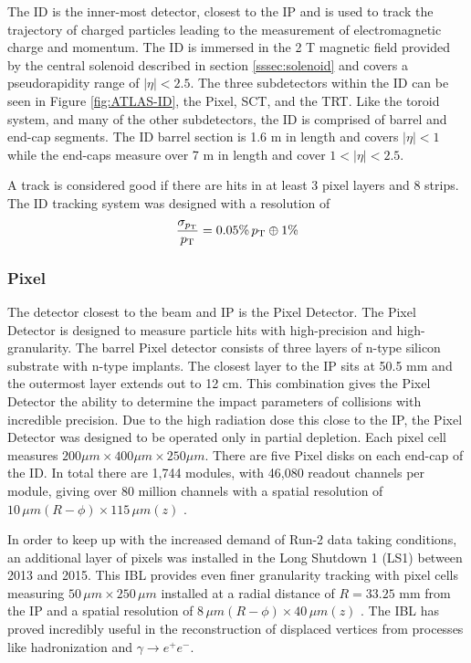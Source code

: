 		The \gls{ID} is the inner-most detector, closest to the \gls{IP} and is used to track the trajectory of charged particles leading to the measurement of electromagnetic charge and momentum. The \gls{ID} is immersed in the 2 T magnetic field provided by the central solenoid described in section \ref{sssec:solenoid} and covers a pseudorapidity range of $|\eta|<2.5$. The three subdetectors within the \gls{ID} can be seen in Figure \ref{fig:ATLAS-ID}, the Pixel, \gls{SCT}, and the \gls{TRT}. Like the toroid system, and many of the other subdetectors, the \gls{ID} is comprised of barrel and end-cap segments. The \gls{ID} barrel section is 1.6 m in length and covers $|\eta|<1$ while the end-caps measure over 7 m in length and cover $1 < |\eta| < 2.5$. 

		A track is considered good if there are hits in at least 3 pixel layers and 8 strips. The ID tracking system was designed with a resolution of 
		\begin{equation}\label{eqn:tracking-resolution}
		\frac{\sigma_{p_{\text{T}}}}{p_{\text{T}}} = 0.05 \% \, p_{\text{T}} \oplus 1\%
		\end{equation}
	
		\subsubsection{Pixel}\label{sssec:pixel}
			The detector closest to the beam and \gls{IP} is the Pixel Detector. The Pixel Detector is designed to measure particle hits with high-precision and high-granularity. The barrel Pixel detector consists of three layers of n-type silicon substrate with n-type implants. The closest layer to the \gls{IP} sits at 50.5 mm and the outermost layer extends out to 12 cm. This combination gives the Pixel Detector the ability to determine the impact parameters of collisions with incredible precision. Due to the high radiation dose this close to the \gls{IP}, the Pixel Detector was designed to be operated only in partial depletion. Each pixel cell measures $200 \mu m \times 400 \mu m \times 250 \mu m$. There are five Pixel disks on each end-cap of the \gls{ID}. In total there are 1,744 modules, with 46,080 readout channels per module, giving over 80 million channels with a spatial resolution of $10 \, \mu m (R-\phi) \times 115 \, \mu m (z)$ \cite{ATLAS-pixel}. 

			In order to keep up with the increased demand of Run-2 data taking conditions, an additional layer of pixels was installed in the Long Shutdown 1 (LS1) between 2013 and 2015. This \gls{IBL} provides even finer granularity tracking with pixel cells measuring $50 \, \mu m \times 250 \, \mu m$ installed at a radial distance of $R=33.25$ mm from the \gls{IP} and a spatial resolution of $8 \, \mu m (R-\phi) \times 40 \, \mu m (z)$ \cite{ATLAS-IBL}. The \gls{IBL} has proved incredibly useful in the reconstruction of displaced vertices from processes like \bjet hadronization and $\gamma \rightarrow e^+ e^-$.


